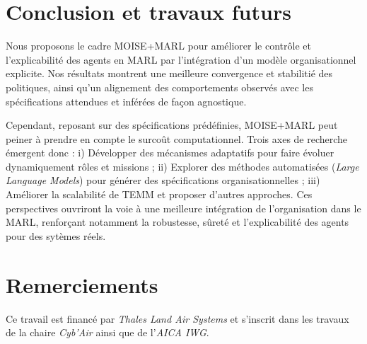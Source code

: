 \documentclass[final]{jfsma}
\begin{document}
\section{Conclusion et travaux futurs}
\label{sec:discussion_conclusion_future_work}

Nous proposons le cadre MOISE+MARL pour améliorer le contrôle et l'explicabilité des agents en MARL par l'intégration d'un modèle organisationnel explicite. Nos résultats montrent une meilleure convergence et stabilitié des politiques, ainsi qu'un alignement des comportements observés avec les spécifications attendues et inférées de façon agnostique.

Cependant, reposant sur des spécifications prédéfinies, MOISE+MARL peut peiner à prendre en compte le surcoût computationnel.
%
Trois axes de recherche émergent donc :
i) Développer des mécanismes adaptatifs pour faire évoluer dynamiquement rôles et missions
; \quad
ii) Explorer des méthodes automatisées (\textit{Large Language Models}) pour générer des spécifications organisationnelles
; \quad
iii) Améliorer la scalabilité de TEMM et proposer d'autres approches.
%
Ces perspectives ouvriront la voie à une meilleure intégration de l'organisation dans le MARL, renforçant notamment la robustesse, sûreté et l'explicabilité des agents pour des sytèmes réels.

\section*{Remerciements}

Ce travail est financé par \emph{Thales Land Air Systems} et s'inscrit dans les travaux de la chaire \emph{Cyb'Air} ainsi que de l'\emph{AICA IWG}.

\renewcommand{\bibname}{}


\begin{myCustomSize}
  
\end{myCustomSize}
\end{document}
